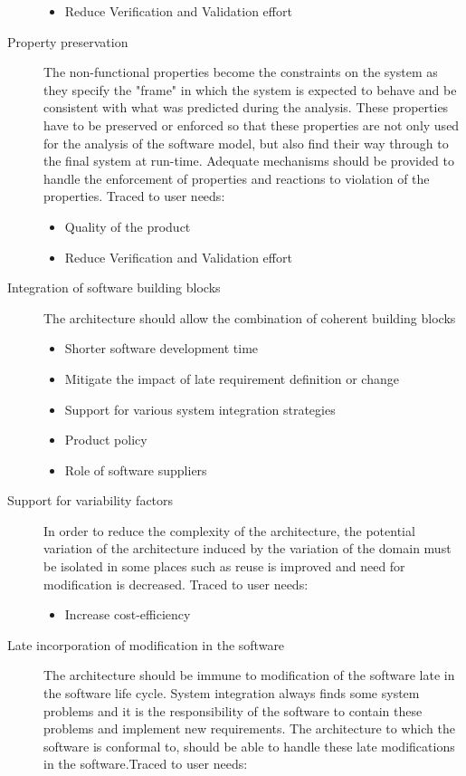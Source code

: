 \begin{description}
\begin{itemize}
\item Reduce Verification and Validation effort 
\end{itemize}
\item [Property preservation] The non-functional properties become the constraints on the system as they specify the "frame" in which the system is expected to behave and be consistent with what was predicted during the analysis. 
These properties have to be preserved or enforced so that these properties are not only used for the analysis of the software model, but also find their way through to the final system at run-time. Adequate mechanisms should be provided to handle the enforcement of properties and reactions to violation of the properties. Traced to user needs:
\begin{itemize}
\item Quality of the product
\item Reduce Verification and Validation effort
\end{itemize} 
\item [Integration of software building blocks] The architecture should allow the combination of coherent building blocks
\begin{itemize}
\item Shorter software development time
\item Mitigate the impact of late requirement definition or change
\item Support for various system integration strategies
\item Product policy
\item Role of software suppliers 
\end{itemize}
\item [Support for variability factors] In order to reduce the complexity of the architecture, the potential variation of the architecture induced by the variation of the domain must be isolated in some places such as reuse is improved and need for modification is decreased. Traced to user needs:
\begin{itemize}
\item Increase cost-efficiency 
\end{itemize}
\item [Late incorporation of modification in the software] The architecture should be immune to modification of the software late in the software life cycle. System integration always finds some system problems and it is the responsibility of the software to contain these problems and implement new requirements. The architecture to which the software is conformal to, should be able to handle these late modifications in the software.Traced to user needs:

\end{description}

